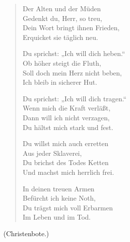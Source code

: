 \begin{verse}
Der Alten und der Müden\\
Gedenkt du, Herr, so treu,\\
Dein Wort bringt ihnen Frieden,\\
Erquicket sie täglich neu.

Du sprichst: „Ich will dich heben.“\\
Ob höher steigt die Fluth,\\
Soll doch mein Herz nicht beben,\\
Ich bleib in sicherer Hut.

Du sprichst: „Ich will dich tragen.“\\
Wenn mich die Kraft verläßt,\\
Dann will ich nicht verzagen,\\
Du hältst mich stark und fest.

Du willst mich auch erretten\\
Aus jeder Sklaverei,\\
Du brichst des Todes Ketten\\
Und machst mich herrlich frei.

In deinen treuen Armen\\
Befürcht ich keine Noth,\\
Du trägst mich voll Erbarmen\\
Im Leben und im Tod.
\end{verse}
(Christenbote.)
